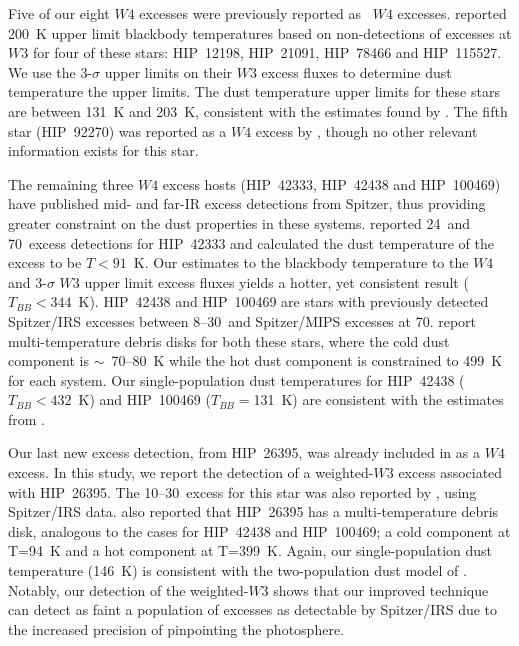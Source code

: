 
    Five of our eight $W4$ excesses were previously reported as \WS\ $W4$ excesses. \citet{Vican2014} reported 200~K upper limit blackbody temperatures based on non-detections of excesses at $W3$ for four of these stars: HIP~12198, HIP~21091, HIP~78466 and HIP~115527. We use the 3-$\sigma$ upper limits on their $W3$ excess fluxes to determine dust temperature the upper limits. The dust temperature upper limits for these stars are between 131~K and 203~K, consistent with the estimates found by \citet{Vican2014}. The fifth star (HIP~92270) was reported as a $W4$ excess by \citet{Mizusawa2012}, though no other relevant information exists for this star.
        
    The remaining three $W4$ excess hosts (HIP~42333, HIP~42438 and HIP~100469) have published mid- and far-IR excess detections from Spitzer, thus providing greater constraint on the dust properties in these systems. \citet{Plavchan2009} reported 24\micron\ and 70\micron\ excess detections for HIP~42333 and calculated the dust temperature of the excess to be $T<91$~K. Our estimates to the blackbody temperature to the $W4$ and 3-$\sigma$ $W3$ upper limit excess fluxes yields a hotter, yet consistent result ($T_{BB}<344$~K). HIP~42438 and HIP~100469 are stars with previously detected Spitzer/IRS excesses between 8--30\micron\ and Spitzer/MIPS excesses at 70\micron. \citet{Chen2014} report multi-temperature debris disks for both these stars, where the cold dust component is $\sim$~70--80~K while the hot dust component is constrained to 499~K for each system. Our single-population dust temperatures for HIP~42438 ($T_{BB}<432$~K) and HIP~100469 ($T_{BB}=$131~K) are consistent with the estimates from \citet{Chen2014}. 
    
    Our last new excess detection, from HIP~26395, was already included in  as a $W4$ excess. In this study, we report the detection of a weighted-$W3$ excess associated with HIP~26395. The 10--30\micron\ excess for this star was also reported by \citet{Chen2014}, using Spitzer/IRS data. \citet{Chen2014} also reported that HIP~26395 has a multi-temperature debris disk, analogous to the cases for HIP~42438 and HIP~100469; a cold component at T=94~K and a hot component at T=399~K. Again, our single-population dust temperature (146~K) is consistent with the two-population dust model of \citet{Chen2014}. Notably, our detection of the weighted-$W3$ shows that our improved technique can detect as faint a population of excesses as detectable by Spitzer/IRS due to the increased precision of pinpointing the photosphere. 
 

